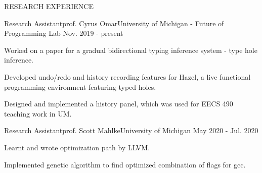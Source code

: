 \documentclass{resume} %
\begin{document}
\begin{rSection}{RESEARCH EXPERIENCE}
\begin{rrsection}{Research Assistant}{prof. Cyrus Omar}{University of Michigan - Future of Programming Lab}{ Nov. 2019 - present}
  \item Worked on a paper for a gradual bidirectional typing inference system - type hole inference. 
  \item Developed undo/redo and history recording features for Hazel, a live functional programming environment featuring typed holes.
  \item Designed and implemented a history panel, which was used for EECS 490 teaching work in UM. 
\end{rrsection}	
\begin{rrsection}{Research Assistant}{prof. Scott Mahlke}{University of Michigan}{ May 2020 - Jul. 2020}
\item Learnt and wrote optimization path by LLVM.
  \item Implemented genetic algorithm to find optimized combination of flags for gcc.
\end{rrsection}	
\end{rSection}
\end{document}
